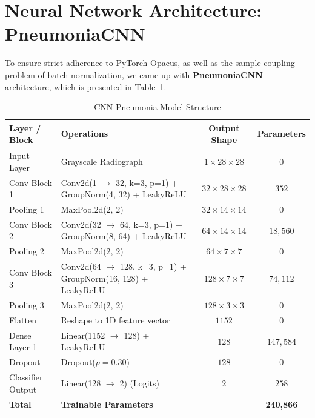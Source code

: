 \documentclass[12pt,a4paper]{report}
\begin{document}
\section{Neural Network Architecture: PneumoniaCNN}
To ensure strict adherence to PyTorch Opacus, as well as the sample coupling problem of batch normalization, we came up with \textbf{PneumoniaCNN} architecture, which is presented in Table~\ref{tab:model_architecture}.

\begin{table}[htbp]
\centering
\caption{CNN Pneumonia Model Structure}
\label{tab:model_architecture}
\begin{tabular}{llcc}
\toprule
\textbf{Layer / Block} & \textbf{Operations} & \textbf{Output Shape} & \textbf{Parameters} \\
\midrule
Input Layer      & Grayscale Radiograph & $1 \times 28 \times 28$ & $0$ \\
Conv Block 1     & Conv2d(1 $\to$ 32, k=3, p=1) + GroupNorm(4, 32) + LeakyReLU & $32 \times 28 \times 28$ & $352$ \\
Pooling 1        & MaxPool2d(2, 2) & $32 \times 14 \times 14$ & $0$ \\
Conv Block 2     & Conv2d(32 $\to$ 64, k=3, p=1) + GroupNorm(8, 64) + LeakyReLU & $64 \times 14 \times 14$ & $18{,}560$ \\
Pooling 2        & MaxPool2d(2, 2) & $64 \times 7 \times 7$ & $0$ \\
Conv Block 3     & Conv2d(64 $\to$ 128, k=3, p=1) + GroupNorm(16, 128) + LeakyReLU & $128 \times 7 \times 7$ & $74{,}112$ \\
Pooling 3        & MaxPool2d(2, 2) & $128 \times 3 \times 3$ & $0$ \\
Flatten          & Reshape to 1D feature vector & $1152$ & $0$ \\
Dense Layer 1    & Linear(1152 $\to$ 128) + LeakyReLU & $128$ & $147{,}584$ \\
Dropout          & Dropout($p=0.30$) & $128$ & $0$ \\
Classifier Output & Linear(128 $\to$ 2) (Logits) & $2$ & $258$ \\
\midrule
\textbf{Total}   & \multicolumn{2}{l}{\textbf{Trainable Parameters}} & \textbf{240,866} \\
\bottomrule
\end{tabular}
\end{table}
\end{document}

